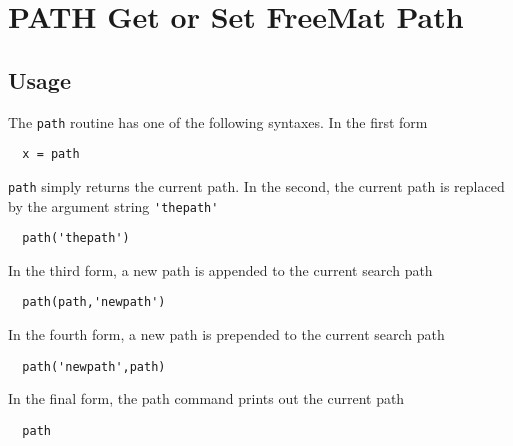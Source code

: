 \section{PATH Get or Set FreeMat Path}

\subsection{Usage}

The \verb|path| routine has one of the following syntaxes.  In the first form
\begin{verbatim}
  x = path
\end{verbatim}
\verb|path| simply returns the current path.  In the second, the current path
is replaced by the argument string \verb|'thepath'|
\begin{verbatim}
  path('thepath')
\end{verbatim}
In the third form, a new path is appended to the current search path
\begin{verbatim}
  path(path,'newpath')
\end{verbatim}
In the fourth form, a new path is prepended to the current search path
\begin{verbatim}
  path('newpath',path)
\end{verbatim}
In the final form, the path command prints out the current path
\begin{verbatim}
  path
\end{verbatim}
